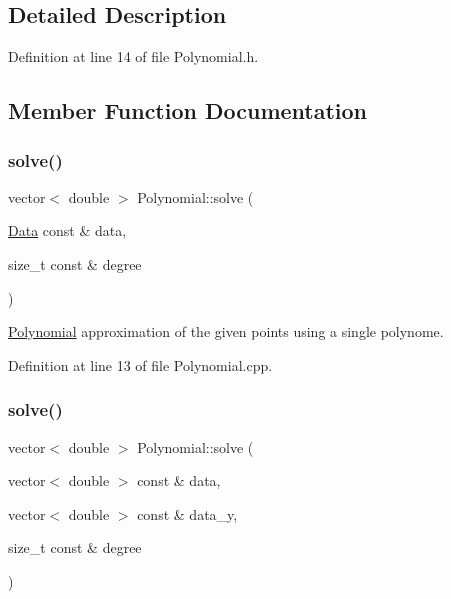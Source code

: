 \subsection{Detailed Description}


Definition at line 14 of file Polynomial.\+h.



\subsection{Member Function Documentation}
\mbox{\label{class_polynomial_a564acf19974e91bcb72d552ee4053691}} 
\subsubsection{\texorpdfstring{solve()}{solve()}\hspace{0.1cm}{\footnotesize\ttfamily [1/3]}}
{\footnotesize\ttfamily vector$<$ double $>$ Polynomial\+::solve (\begin{DoxyParamCaption}\item[{\mbox{\hyperlink{struct_data}{Data}} const \&}]{data,  }\item[{size\+\_\+t const \&}]{degree }\end{DoxyParamCaption})}



\mbox{\hyperlink{class_polynomial}{Polynomial}} approximation of the given points using a single polynome. 



Definition at line 13 of file Polynomial.\+cpp.

\mbox{\label{class_polynomial_ae67730df0a2e45a87c9cb244fe03ad6b}} 
\subsubsection{\texorpdfstring{solve()}{solve()}\hspace{0.1cm}{\footnotesize\ttfamily [2/3]}}
{\footnotesize\ttfamily vector$<$ double $>$ Polynomial\+::solve (\begin{DoxyParamCaption}\item[{vector$<$ double $>$ const \&}]{data,  }\item[{vector$<$ double $>$ const \&}]{data\+\_\+y,  }\item[{size\+\_\+t const \&}]{degree }\end{DoxyParamCaption})}




